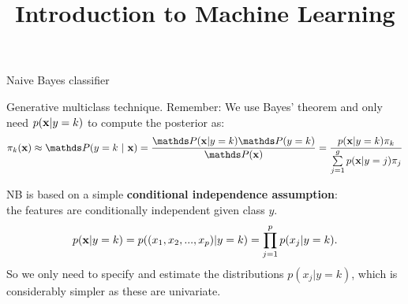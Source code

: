 \documentclass[11pt,compress,t,notes=noshow, xcolor=table]{beamer}
\title{Introduction to Machine Learning}
\begin{document}

\framebreak

\begin{vbframe}{Naive Bayes classifier}

Generative multiclass technique. Remember: We use Bayes' theorem and only need $p(\mathbf{x} | y= k)$ to compute the posterior as:
$$\pikx \approx \postk = \frac{\P(\xv | y = k) \P(y = k)}{\P(\xv)} = \frac{\pdfxyk \pik}{\sumjg \pdfxyk[j] \pi_j} $$


NB is based on a simple \textbf{conditional independence assumption}: \\
the features are conditionally independent given class $y$.
$$
p(\mathbf{x} | y= k) = p((x_1, x_2, ..., x_p)|y = k)=\prod\limits_{j=1}^p p(x_j|y = k).
$$
So we only need to specify and estimate the distributions $p(x_j|y = k)$, which is considerably simpler as these are univariate.

\end{vbframe}
\end{document}
